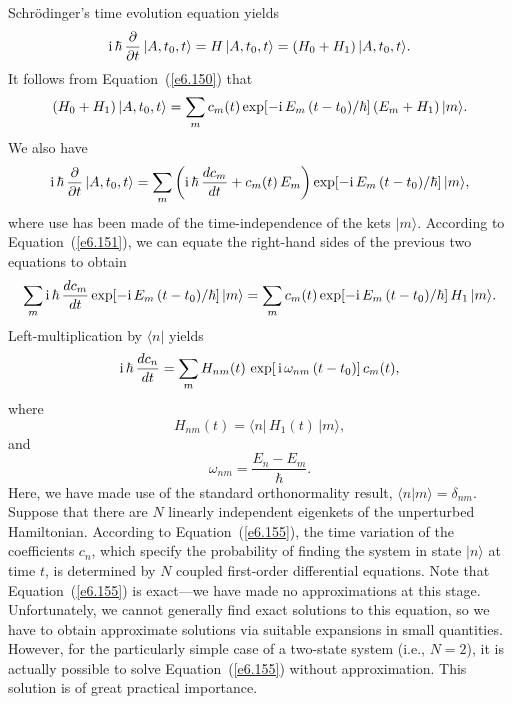 Schr\"{o}dinger's time evolution equation yields
\begin{equation}\label{e6.151}
{\rm i}\,\hbar\, \frac{\partial}{\partial t}\,|A, t_0, t\rangle  = 
H\,|A,t_0,t\rangle= (H_0+H_1) \,|A,t_0,t\rangle.
\end{equation}
It follows from Equation~(\ref{e6.150}) that
\begin{equation}
(H_0+H_1)\, |A,t_0,t\rangle = \sum_m c_m(t) \exp[-{\rm i}\,E_m\, (t-t_0)/\hbar]\,
(E_m + H_1)\,|m\rangle.
\end{equation}
We also have
\begin{equation}
{\rm i}\,\hbar\, \frac{\partial}{\partial t}\,|A,t_0,t\rangle =
\sum_m \left({\rm i}\,\hbar \,\frac{d c_m}{dt}+ c_m(t)\, E_m\right)
 \exp[-{\rm i}\,E_m \,(t-t_0)/\hbar]\, |m\rangle,
\end{equation}
where use has been made of the time-independence of the kets
$|m\rangle$. According to Equation~(\ref{e6.151}), we can equate the right-hand sides
of the previous two equations to obtain
\begin{equation}
\sum_m {\rm i}\,\hbar\, \frac{d c_m}{dt}\exp[-{\rm i}\,E_m \,(t-t_0)/\hbar] \,|m\rangle = \sum_m c_m(t) \exp[-{\rm i}\,E_m \,(t-t_0)/\hbar]\,
H_1\, |m\rangle.
\end{equation}
Left-multiplication by $\langle n|$ yields
\begin{equation}\label{e6.155}
{\rm i}\,\hbar\, \frac{d c_n}{dt} = \sum_m H_{nm}(t)\, \exp[\,{\rm i}\,\omega_{nm}\, (t-t_0)]\,
c_m(t),
\end{equation}
where
\begin{equation}
H_{nm}(t) = \langle n |\,H_1(t)\,|m \rangle,
\end{equation}
and
\begin{equation}
\omega_{nm} = \frac{E_n - E_m}{\hbar}.
\end{equation}
Here, we have made use of the standard  orthonormality result, $\langle n|m\rangle
=\delta_{nm}$. Suppose that there are $N$ linearly independent eigenkets
of the unperturbed Hamiltonian. According to Equation~(\ref{e6.155}), the
time variation of the coefficients $c_n$, which specify the
probability of finding the system in state $|n\rangle$ at time $t$,
is  determined by $N$ coupled first-order differential equations. Note
that Equation~(\ref{e6.155}) is exact---we have made no approximations at this stage.
Unfortunately, we cannot generally find exact solutions to this equation,
so we have to obtain approximate solutions via suitable expansions  in small
quantities. However, for the particularly simple case of a two-state system
({\rm i.e.}, $N=2$), it is actually possible to solve Equation~(\ref{e6.155}) without
approximation. This
solution is of great  practical importance. 
 
